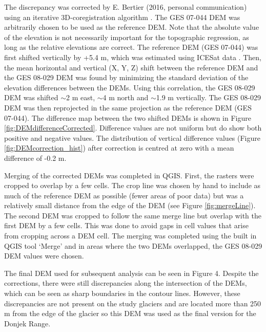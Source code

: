 \documentclass{sfuthesis}
\begin{document}
The discrepancy was corrected by E. Bertier (2016, personal communication) using an iterative 3D-coregistration algorithm \citep{Berthier2007}. The GES 07-044 DEM was arbitrarily chosen to be used as the reference DEM. Note that the absolute value of the elevation is not necessarily important for the topographic regression, as long as the relative elevations are correct. The reference DEM (GES 07-044) was first shifted vertically by +5.4 m, which was estimated using ICESat data \citep{Berthier2010}. Then, the mean horizontal and vertical (X, Y, Z) shift between the reference DEM and the GES 08-029 DEM was found by minimizing the standard deviation of the elevation differences between the DEMs. Using this correlation, the GES 08-029 DEM  was shifted $\sim$2 m east, $\sim$4 m north and $\sim$1.9 m vertically. The GES 08-029 DEM was then reprojected in the same projection as the reference DEM (GES 07-044). The difference map between the two shifted DEMs is shown in Figure \ref{fig:DEMdifferenceCorrected}. Difference values are not uniform but do show both positive and negative values. The distribution of vertical difference values (Figure \ref{fig:DEMcorrection_hist}) after correction is centred at zero with a mean difference of -0.2 m.

Merging of the corrected DEMs was completed in QGIS. First, the rasters were cropped to overlap by a few cells. The crop line was chosen by hand to include as much of the reference DEM as possible (fewer areas of poor data) but was a relatively small distance from the edge of the DEM (see Figure \ref{fig:mergeLine}). The second DEM was cropped to follow the same merge line but overlap with the first DEM by a few cells. This was done to avoid gaps in cell values that arise from cropping across a DEM cell. The merging was completed using the built in QGIS tool `Merge' and in areas where the two DEMs overlapped, the GES 08-029 DEM values were chosen.

The final DEM used for subsequent analysis can be seen in Figure 4. Despite the corrections, there were still discrepancies along the intersection of the DEMs, which can be seen as sharp boundaries in the contour lines. However, these discrepancies are not present on the study glaciers and are located more than 250 m from the edge of the glacier so this DEM was used as the final version for the Donjek Range.

\begin{figure}
  \label{fig:finalDEM}
\end{figure}
\end{document}
